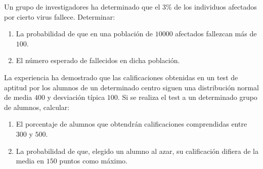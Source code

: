 \begin{ejercicio}
    Un grupo de investigadores ha determinado que el $3\%$ de los individuos afectados por cierto virus fallece. Determinar:
    \begin{enumerate}
        \item La probabilidad de que en una población de $10000$ afectados fallezcan más de $100$.
        \item El número esperado de fallecidos en dicha población.
    \end{enumerate}
\end{ejercicio}

\begin{ejercicio}
    La experiencia ha demostrado que las calificaciones obtenidas en un test de aptitud por los alumnos de un determinado centro siguen una distribución normal de media $400$ y desviación típica $100$. Si se realiza el test a un determinado grupo de alumnos, calcular:
    \begin{enumerate}
        \item El porcentaje de alumnos que obtendrán calificaciones comprendidas entre $300$ y $500$.
        \item La probabilidad de que, elegido un alumno al azar, su calificación difiera de la media en $150$ puntos como máximo.
    \end{enumerate}
\end{ejercicio}

